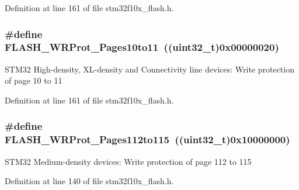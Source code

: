 Definition at line 161 of file stm32f10x\+\_\+flash.\+h.

\subsubsection[{\texorpdfstring{F\+L\+A\+S\+H\+\_\+\+W\+R\+Prot\+\_\+\+Pages10to11}{FLASH_WRProt_Pages10to11}}]{\setlength{\rightskip}{0pt plus 5cm}\#define F\+L\+A\+S\+H\+\_\+\+W\+R\+Prot\+\_\+\+Pages10to11~(({\bf uint32\+\_\+t})0x00000020)}\hypertarget{group___option___bytes___write___protection_ga778d8038df46c0d25d9a24717a5c5dc9}{}\label{group___option___bytes___write___protection_ga778d8038df46c0d25d9a24717a5c5dc9}
S\+T\+M32 High-\/density, X\+L-\/density and Connectivity line devices\+: Write protection of page 10 to 11 

Definition at line 161 of file stm32f10x\+\_\+flash.\+h.

\subsubsection[{\texorpdfstring{F\+L\+A\+S\+H\+\_\+\+W\+R\+Prot\+\_\+\+Pages112to115}{FLASH_WRProt_Pages112to115}}]{\setlength{\rightskip}{0pt plus 5cm}\#define F\+L\+A\+S\+H\+\_\+\+W\+R\+Prot\+\_\+\+Pages112to115~(({\bf uint32\+\_\+t})0x10000000)}\hypertarget{group___option___bytes___write___protection_gacd2d5839240b77f70be15e76086745ab}{}\label{group___option___bytes___write___protection_gacd2d5839240b77f70be15e76086745ab}
S\+T\+M32 Medium-\/density devices\+: Write protection of page 112 to 115 

Definition at line 140 of file stm32f10x\+\_\+flash.\+h.

